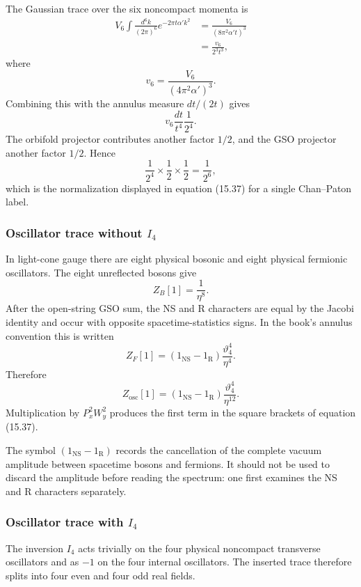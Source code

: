 \documentclass[
  10pt,
  a4paper,
  openany]{book}
\begin{document}
The Gaussian trace over the six noncompact momenta is \[
\begin{aligned}
V_6\int\frac{d^6k}{(2\pi)^6}
e^{-2\pi t\alpha' k^2}
&=
\frac{V_6}{(8\pi^2\alpha't)^3}\\
&=
\frac{v_6}{2^3t^3},
\end{aligned}
\] where \[
v_6
=
\frac{V_6}{(4\pi^2\alpha')^3}.
\] Combining this with the annulus measure \(dt/(2t)\) gives \[
v_6\frac{dt}{t^4}\frac1{2^4}.
\] The orbifold projector contributes another factor \(1/2\), and the
GSO projector another factor \(1/2\). Hence \[
\frac1{2^4}\times\frac12\times\frac12
=
\boxed{\frac1{2^6}},
\] which is the normalization displayed in equation (15.37) for a single
Chan--Paton label.

\subsubsection{\texorpdfstring{Oscillator trace without
\(I_4\)}{Oscillator trace without I\_4}}\label{oscillator-trace-without-i_4}

In light-cone gauge there are eight physical bosonic and eight physical
fermionic oscillators. The eight unreflected bosons give \[
Z_B[1]
=
\frac1{\eta^8}.
\] After the open-string GSO sum, the NS and R characters are equal by
the Jacobi identity and occur with opposite spacetime-statistics signs.
In the book's annulus convention this is written \[
Z_F[1]
=
(1_{\mathrm{NS}}-1_{\mathrm R})
\frac{\vartheta_4^4}{\eta^4}.
\] Therefore \[
\boxed{
Z_{\mathrm{osc}}[1]
=
(1_{\mathrm{NS}}-1_{\mathrm R})
\frac{\vartheta_4^4}{\eta^{12}}.
}
\] Multiplication by \(P_x^2W_y^2\) produces the first term in the
square brackets of equation (15.37).

The symbol \((1_{\mathrm{NS}}-1_{\mathrm R})\) records the cancellation
of the complete vacuum amplitude between spacetime bosons and fermions.
It should not be used to discard the amplitude before reading the
spectrum: one first examines the NS and R characters separately.

\subsubsection{\texorpdfstring{Oscillator trace with
\(I_4\)}{Oscillator trace with I\_4}}\label{oscillator-trace-with-i_4}

The inversion \(I_4\) acts trivially on the four physical noncompact
transverse oscillators and as \(-1\) on the four internal oscillators.
The inserted trace therefore splits into four even and four odd real
fields.
\end{document}
